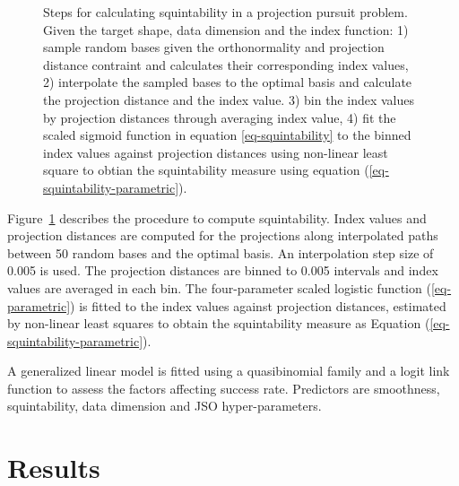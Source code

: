 \documentclass[
  12pt,
]{interact}
\theoremstyle{plain}
\begin{document}
\begin{figure}


\caption{\label{fig-squintability}Steps for calculating squintability in
a projection pursuit problem. Given the target shape, data dimension and
the index function: 1) sample random bases given the orthonormality and
projection distance contraint and calculates their corresponding index
values, 2) interpolate the sampled bases to the optimal basis and
calculate the projection distance and the index value. 3) bin the index
values by projection distances through averaging index value, 4) fit the
scaled sigmoid function in equation \eqref{eq-squintability} to the
binned index values against projection distances using non-linear least
square to obtian the squintability measure using equation
(\ref{eq-squintability-parametric}).}

\end{figure}%

Figure~\ref{fig-squintability} describes the procedure to compute
squintability. Index values and projection distances are computed for
the projections along interpolated paths between 50 random bases and the
optimal basis. An interpolation step size of 0.005 is used. The
projection distances are binned to 0.005 intervals and index values are
averaged in each bin. The four-parameter scaled logistic function
(\ref{eq-parametric}) is fitted to the index values against projection
distances, estimated by non-linear least squares to obtain the
squintability measure as Equation (\ref{eq-squintability-parametric}).

A generalized linear model is fitted using a quasibinomial family and a
logit link function to assess the factors affecting success rate.
Predictors are smoothness, squintability, data dimension and JSO
hyper-parameters.

\section{Results}\label{sec-sim-res}
\end{document}
